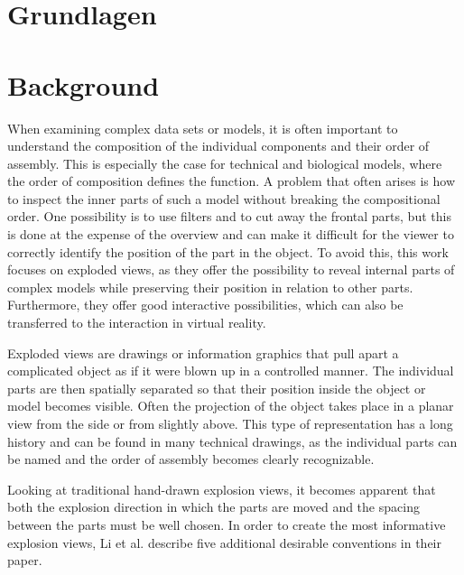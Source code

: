 {\chapter{Grundlagen}}
{\chapter{Background}}
\label{sec:background}





When examining complex data sets or models, it is often important to understand the composition of the individual components and their order of assembly. 
This is especially the case for technical and biological models, where the order of composition defines the function. 
A problem that often arises is how to inspect the inner parts of such a model without breaking the compositional order. 
One possibility is to use filters and to cut away the frontal parts, but this is done at the expense of the overview and can make it difficult for the viewer to correctly identify the position of the part in the object. 
To avoid this, this work focuses on exploded views, as they offer the possibility to reveal internal parts of complex models while preserving their position in relation to other parts. 
Furthermore, they offer good interactive possibilities, which can also be transferred to the interaction in virtual reality.

Exploded views are drawings or information graphics that pull apart a complicated object as if it were blown up in a controlled manner. 
The individual parts are then spatially separated so that their position inside the object or model becomes visible. 
Often the projection of the object takes place in a planar view from the side or from slightly above.
This type of representation has a long history and can be found in many technical drawings, as the individual parts can be named and the order of assembly becomes clearly recognizable. %

Looking at traditional hand-drawn explosion views, it becomes apparent that both the explosion direction in which the parts are moved and the spacing between the parts must be well chosen. 
In order to create the most informative explosion views, Li et al. describe five additional desirable conventions in their paper. %

